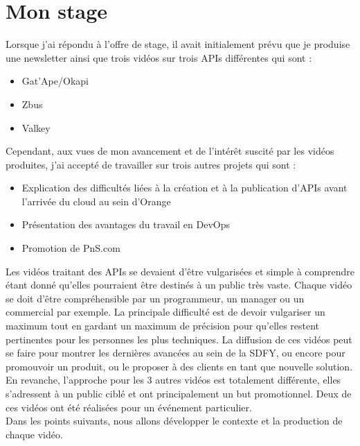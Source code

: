\chapter{Mon stage}
\label{sec:unchapitre}

Lorsque j'ai répondu à l'offre de stage, il avait initialement prévu que je produise une newsletter ainsi que trois vidéos sur trois APIs différentes qui sont :

\begin{itemize}
    \item Gat'Ape/Okapi
    \item Zbus
    \item Valkey
\end{itemize}

Cependant, aux vues de mon avancement et de l'intérêt suscité par les vidéos produites, j'ai accepté de travailler sur trois autres projets qui sont :

\begin{itemize}
    \item Explication des difficultés liées à la création et à la publication d'APIs avant l'arrivée du cloud au sein d'Orange
    \item Présentation des avantages du travail en DevOps
    \item Promotion de PnS.com
\end{itemize}

Les vidéos traitant des APIs se devaient d'être vulgarisées et simple à comprendre étant donné qu'elles pourraient être destinés à un public très vaste. Chaque vidéo se doit d'être compréhensible par un programmeur, un manager ou un commercial par exemple. La principale difficulté est de devoir vulgariser un maximum tout en gardant un maximum de précision pour qu'elles restent pertinentes pour les personnes les plus techniques. La diffusion de ces vidéos peut se faire pour montrer les dernières avancées au sein de la SDFY, ou encore pour promouvoir un produit, ou le proposer à des clients en tant que nouvelle solution. \\

En revanche, l'approche pour les 3 autres vidéos est totalement différente, elles s'adressent à un public ciblé et ont principalement un but promotionnel. Deux de ces vidéos ont été réalisées pour un événement particulier. \\

Dans les points suivants, nous allons développer le contexte et la production de chaque vidéo.



